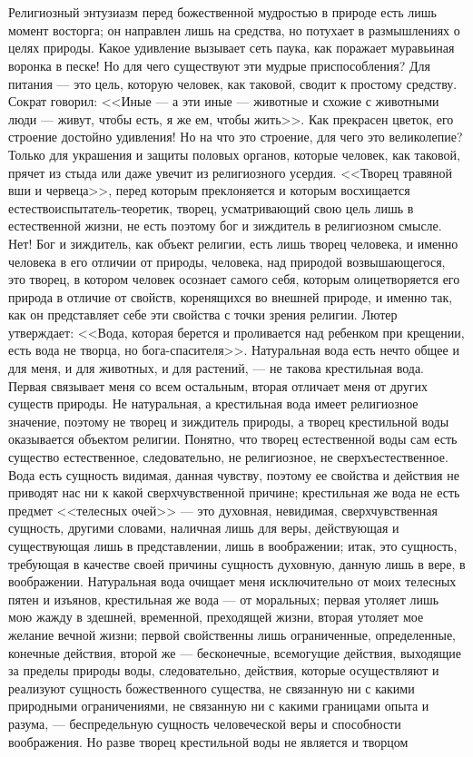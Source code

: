 \documentclass[12pt]{article}
\begin{document}
\section{}

Религиозный энтузиазм перед божественной мудростью в природе есть лишь момент восторга; он направлен лишь на средства, но потухает в размышлениях о целях природы. Какое удивление вызывает сеть паука, как поражает муравьиная воронка в песке! Но для чего существуют эти мудрые приспособления? Для питания --- это цель, которую человек, как таковой, сводит к простому средству. Сократ говорил: <<Иные --- а эти иные --- животные и схожие с животными люди --- живут, чтобы есть, я же ем, чтобы жить>>. Как прекрасен цветок, его строение достойно удивления! Но на что это строение, для чего это великолепие? Только для украшения и защиты половых органов, которые человек, как таковой, прячет из стыда или даже увечит из религиозного усердия. <<Творец травяной вши и червеца>>, перед которым преклоняется и которым восхищается естествоиспытатель-теоретик, творец, усматривающий свою цель лишь в естественной жизни, не есть поэтому бог и зиждитель в религиозном смысле. Нет! Бог и зиждитель, как объект религии, есть лишь творец человека, и именно человека в его отличии от природы, человека, над природой возвышающегося, это творец, в котором человек осознает самого себя, которым олицетворяется его природа в отличие от свойств, коренящихся во внешней природе, и именно так, как он представляет себе эти свойства с точки зрения религии. Лютер утверждает: <<Вода, которая берется и проливается над ребенком при крещении, есть вода не творца, но бога-спасителя>>. Натуральная вода есть нечто общее и для меня, и для животных, и для растений, --- не такова крестильная вода. Первая связывает меня со всем остальным, вторая отличает меня от других существ природы. Не натуральная, а крестильная вода имеет религиозное значение, поэтому не творец и зиждитель природы, а творец крестильной воды оказывается объектом религии. Понятно, что творец естественной воды сам есть существо естественное, следовательно, не религиозное, не сверхъестественное. Вода есть сущность видимая, данная чувству, поэтому ее свойства и действия не приводят нас ни к какой сверхчувственной причине; крестильная же вода не есть предмет <<телесных очей>> --- это духовная, невидимая, сверхчувственная сущность, другими словами, наличная лишь для веры, действующая и существующая лишь в представлении, лишь в воображении; итак, это сущность, требующая в качестве своей причины сущность духовную, данную лишь в вере, в воображении. Натуральная вода очищает меня исключительно от моих телесных пятен и изъянов, крестильная же вода --- от моральных; первая утоляет лишь мою жажду в здешней, временной, преходящей жизни, вторая утоляет мое желание вечной жизни; первой свойственны лишь ограниченные, определенные, конечные действия, второй же --- бесконечные, всемогущие действия, выходящие за пределы природы воды, следовательно, действия, которые осуществляют и реализуют сущность божественного существа, не связанную ни с какими природными ограничениями, не связанную ни с какими границами опыта и разума, --- беспредельную сущность человеческой веры и способности воображения. Но разве творец крестильной воды не является и творцом 
\end{document}
